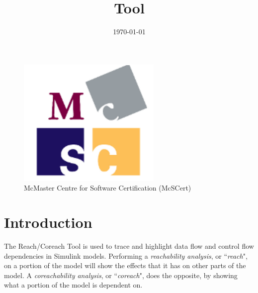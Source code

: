 \documentclass{article}
\title{\ToolName Tool}
\date{\monthyeardate\today}
\makeatletter
\newcommand{\ToolName}{Reach/Coreach\@\xspace}
\makeatother
\begin{document}
\maketitle
\vfill

\begin{figure}
	\centering
	\includegraphics[]{../figs/McSCert_Logo.pdf} \\
	McMaster Centre for Software Certification (McSCert)
\end{figure}

\newpage

\tableofcontents
\newpage

\section{Introduction}

The \ToolName Tool is used to trace and highlight data flow and control flow dependencies in Simulink models. Performing a \emph{reachability analysis}, or ``\emph{reach}", on a portion of the model will show the effects that it has on other parts of the model. A \emph{coreachability analysis}, or ``\emph{coreach}", does the opposite, by showing what a portion of the model is dependent on.
\end{document}
